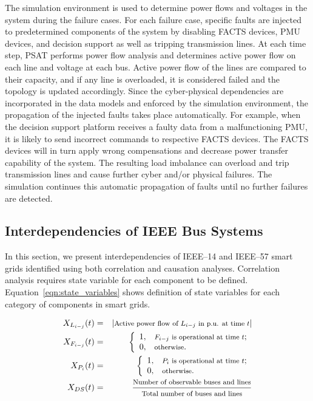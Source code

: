 \documentclass[12pt]{elsarticle}
\begin{document}
The simulation environment is used to determine power flows and voltages in the system during the failure cases. For each failure case, specific faults are injected to predetermined components of the system by disabling FACTS devices, PMU devices, and decision support as well as tripping transmission lines. At each time step, PSAT performs power flow analysis and determines active power flow on each line and voltage at each bus. Active power flow of the lines are compared to their capacity, and if any line is overloaded, it is considered failed and the topology is updated accordingly. Since the cyber-physical dependencies are incorporated in the data models and enforced by the simulation environment, the propagation of the injected faults takes place automatically. For example, when the decision support platform receives a faulty data from a malfunctioning PMU, it is likely to send incorrect commands to respective FACTS devices. The FACTS devices will in turn apply wrong compensations and decrease power transfer capability of the system. The resulting load imbalance can overload and trip transmission lines and cause further cyber and/or physical failures. The simulation continues this automatic propagation of faults until no further failures are detected.

\subsection{Interdependencies of IEEE Bus Systems}
\label{sec:case_study:interdep}
In this section, we present interdependencies of IEEE--14 and IEEE--57 smart grids identified using both correlation and causation analyses. Correlation analysis requires state variable for each component to be defined. Equation~\eqref{eqn:state_variables} shows definition of state variables for each category of components in smart grids.

\begin{eqnarray}
X_{L_{i-j}}(t) &=& |\text{\footnotesize Active power flow of $L_{i-j}$ in p.u. at time $t$}| \nonumber \\
X_{F_{i-j}}(t) &=& \left\{
                     \begin{array}{ll}
                       1, & \hbox{\text{\footnotesize $F_{i-j}$ is operational at time $t$};} \\
                       0, & \hbox{\text{\footnotesize otherwise}.}
                     \end{array}
                   \right. \nonumber \\
X_{P_{i}}(t) &=& \left\{
                     \begin{array}{ll}
                       1, & \hbox{\text{\footnotesize $P_{i}$ is operational at time $t$};} \\
                       0, & \hbox{\text{\footnotesize otherwise}.}
                     \end{array}
                   \right. \nonumber \\
X_{DS}(t) &=& \dfrac{\text{\footnotesize Number of observable buses and lines}}{\text{\footnotesize Total number of buses and lines}}
\label{eqn:state_variables}
\end{eqnarray}
\end{document}
